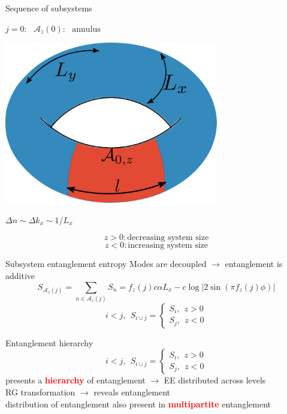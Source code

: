 \documentclass[11pt,aspectratio=169]{beamer}
\newcommand{\focus}[1]{\textcolor{red}{\bf{#1}}}
\begin{document}
\begin{frame}{Sequence of subsystems}
\hspace*{\fill}
\begin{minipage}{0.35\textwidth}
\(j=0: ~ ~ ~ \mathcal{A}_z(0): ~ ~ ~\text{annulus}\)
\end{minipage}
\hspace*{\fill}
\begin{minipage}{0.5\textwidth}
	\includegraphics[width=0.7\textwidth]{figures/A_m1.pdf}
\end{minipage}

\vspace*{\fill}
\begin{minipage}{0.4\textwidth}
	\large \( \Delta n \sim \Delta k_x \sim 1/L_x \)
\end{minipage}
\begin{minipage}{0.4\textwidth}
	\[ z > 0: \text{decreasing system size}\]
	\[ z < 0: \text{increasing system size}\]
\end{minipage}
\end{frame}

\begin{frame}{Subsystem entanglement entropy}
Modes are decoupled \(\longrightarrow\) entanglement is additive
\[S_{\mathcal{A}_z(j)} = \sum_{n \in \mathcal{A}_z(j)} S_n = f_z(j) c \alpha L_x - c \log \big|2\sin\left(\pi f_z(j)\phi\right)\big|\]
\[i < j, ~ ~ S_{i\cup j} =
	\begin{cases}
	S_{i}, ~ ~ z > 0\\
	S_{j}, ~ ~ z < 0
	\end{cases}
\]
\end{frame}
	
\begin{frame}{Entanglement hierarchy}
\[i < j, ~ ~ S_{i\cup j} =
	\begin{cases}
	S_{i}, ~ ~ z > 0\\
	S_{j}, ~ ~ z < 0
	\end{cases}
\]
presents a \focus{hierarchy} of entanglement \(\longrightarrow\) EE distributed across levels
\\[10pt]
RG transformation \(\longrightarrow\) reveals entanglement
\\[10pt]
distribution of entanglement also present in \focus{multipartite} entanglement
\end{frame}
\end{document}
